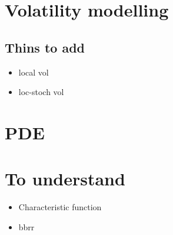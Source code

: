 \documentclass{article}
\begin{document}
\section{Volatility modelling}

\subsection{Thins to add}
\begin{itemize}
	\item local vol
	\item loc-stoch vol
\end{itemize}

\section{PDE}

\section{To understand}
\begin{itemize}
	\item Characteristic function
	\item bbrr
\end{itemize}
\end{document}
